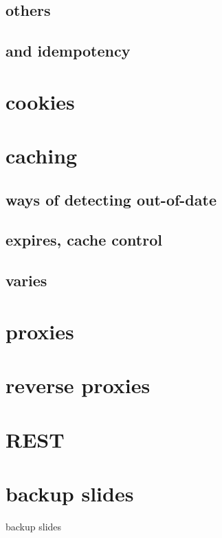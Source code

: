 \subsection{others}

\subsection{and idempotency}

\section{cookies}

\section{caching}

\subsection{ways of detecting out-of-date}

\subsection{expires, cache control}

\subsection{varies}

\section{proxies}

\section{reverse proxies}

\section{REST}


\section{backup slides}
\begin{frame}{backup slides}
\end{frame}


